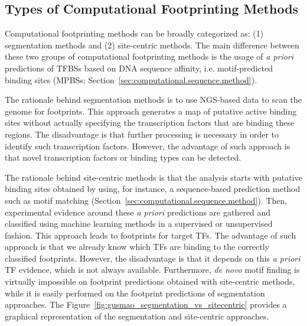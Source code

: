 \subsection{Types of Computational Footprinting Methods}
\label{sec:types.computational.footprinting.methods}

Computational footprinting methods can be broadly categorized as: (1) segmentation methods and (2) site-centric methods. The main difference between these two groups of computational footprinting methods is the usage of \emph{a priori} predictions of TFBSs based on DNA sequence affinity, i.e. motif-predicted binding sites (MPBSs; Section~\ref{sec:computational.sequence.method}).

The rationale behind segmentation methods is to use NGS-based data to scan the genome for footprints. This approach generates a map of putative active binding sites without actually specifying the transcription factors that are binding these regions. The disadvantage is that further processing is necessary in order to identify such transcription factors. However, the advantage of such approach is that novel transcription factors or binding types can be detected.

The rationale behind site-centric methods is that the analysis starts with putative binding sites obtained by using, for instance, a sequence-based prediction method such as motif matching (Section~\ref{sec:computational.sequence.method}). Then, experimental evidence around these \emph{a priori} predictions are gathered and classified using machine learning methods in a supervised or unsupervised fashion. This approach leads to footprints for target TFs. The advantage of such approach is that we already know which TFs are binding to the correctly classified footprints. However, the disadvantage is that it depends on this \emph{a priori} TF evidence, which is not always available. Furthermore, \emph{de novo} motif finding is virtually impossible on footprint predictions obtained with site-centric methods, while it is easily performed on the footprint predictions of segmentation approaches. The Figure~\ref{fig:gusmao_segmentation_vs_sitecentric} provides a graphical representation of the segmentation and site-centric approaches.


